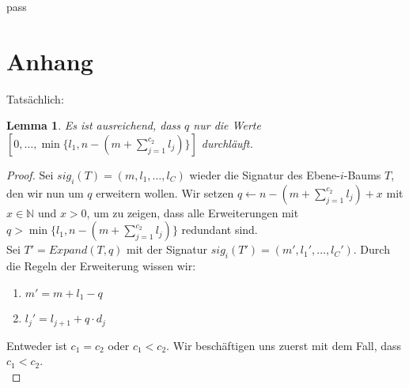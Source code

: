 pass\documentclass[a4paper,10pt,ngerman]{scrartcl}
\newtheorem{lemma}[satz]{Lemma}
\begin{document}
    \section{Anhang}
    Tatsächlich:
    \begin{lemma}
        \label{lem:reader_2}
        Es ist ausreichend, dass $q$ nur die Werte $[0, \dots, \min\{l_1, n - (m + \sum^{c_2}_{j=1} l_j)\}]$ durchläuft.
    \end{lemma}
    \begin{proof}
        Sei $sig_i(T) = (m, l_1, \dots, l_C)$ wieder die Signatur des Ebene-$i$-Baums $T$, den wir nun um $q$ erweitern wollen.
        Wir setzen $q \gets n - (m + \sum^{c_2}_{j=1} l_j) + x$ mit $x \in \mathbb N$ und $x > 0$, um zu zeigen, dass alle Erweiterungen mit $q > \min\{l_1, n - (m + \sum^{c_2}_{j=1} l_j)\}$ redundant sind. \\
        Sei $T' = Expand(T, q)$ mit der Signatur $sig_i(T') = (m', l_1', \dots, l_C')$.
        Durch die Regeln der Erweiterung wissen wir:
        \begin{enumerate}
            \item $m' = m + l_1 - q$
            \item $l_j' = l_{j+1} + q \cdot d_j$
        \end{enumerate}
        Entweder ist $c_1 = c_2$ oder $c_1 < c_2$.
        Wir beschäftigen uns zuerst mit dem Fall, dass $c_1 < c_2$. \\


\end{proof}
\end{document}
